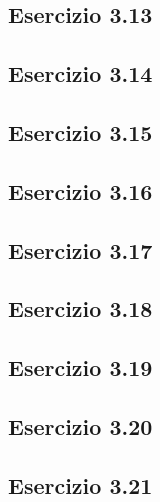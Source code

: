 \subsection{\textbf{Esercizio 3.13}}

\subsection{\textbf{Esercizio 3.14}}

\subsection{\textbf{Esercizio 3.15}}

\subsection{\textbf{Esercizio 3.16}}

\subsection{\textbf{Esercizio 3.17}}

\subsection{\textbf{Esercizio 3.18}}

\subsection{\textbf{Esercizio 3.19}}

\subsection{\textbf{Esercizio 3.20}}

\subsection{\textbf{Esercizio 3.21}}

